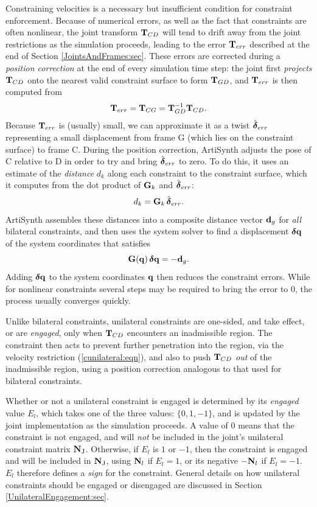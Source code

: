 Constraining velocities is a necessary but insufficient condition for
constraint enforcement. Because of numerical errors, as well as the
fact that constraints are often nonlinear, the joint transform
${\bf T}_{CD}$ will tend to drift away from the joint restrictions as the
simulation proceeds, leading to the error ${\bf T}_{err}$ described at the
end of Section \ref{JointsAndFrames:sec}. These errors are corrected
during a {\it position correction} at the end of every simulation time
step: the joint first {\it projects} ${\bf T}_{CD}$ onto the nearest valid
constraint surface to form ${\bf T}_{GD}$, and ${\bf T}_{err}$ is then computed from
%
\begin{equation}
{\bf T}_{err} = {\bf T}_{CG} = {\bf T}_{GD}^{-1} {\bf T}_{CD}.
\end{equation}
%
Because ${\bf T}_{err}$ is (usually) small, we can approximate it as
a twist $\hat{\boldsymbol\delta}_{err}$ representing a small displacement from frame
G (which lies on the constraint surface) to frame C. During the
position correction, ArtiSynth adjusts the pose of C relative to D in
order to try and bring $\hat{\boldsymbol\delta}_{err}$ to zero. To do this, it uses
an estimate of the {\it distance} $d_k$ along each constraint to the
constraint surface, which it computes from the dot product of ${\bf G}_k$
and $\hat{\boldsymbol\delta}_{err}$:
%
\begin{equation}
d_k = {\bf G}_k \, \hat{\boldsymbol\delta}_{err}.
\end{equation}
%
ArtiSynth assembles these distances into a composite distance vector
${\bf d}_g$ for {\it all} bilateral constraints, and then uses the system
solver to find a displacement $\boldsymbol\delta {\bf q}$ of the system coordinates
that satisfies
%
\begin{equation*}
{\bf G}({\bf q}) \, \boldsymbol\delta {\bf q} = -{\bf d}_g.
\end{equation*}
%
Adding $\boldsymbol\delta {\bf q}$ to the system coordinates ${\bf q}$ then reduces the
constraint errors. While for nonlinear constraints several steps may be
required to bring the error to 0, the process usually converges
quickly.

Unlike bilateral constraints, unilateral constraints are one-sided,
and take effect, or are {\it engaged}, only when ${\bf T}_{CD}$ encounters
an inadmissible region.  The constraint then acts to prevent further
penetration into the region, via the velocity restriction
(\ref{cunilateral:eqn}), and also to push ${\bf T}_{CD}$ {\it out} of the
inadmissible region, using a position correction analogous to that
used for bilateral constraints.

Whether or not a unilateral constraint is engaged is determined by its
{\it engaged} value $E_l$, which takes one of the three values:
$\{0, 1, -1\}$, and is updated by the joint implementation as the
simulation proceeds.  A value of 0 means that the constraint is not
engaged, and will {\it not} be included in the joint's unilateral
constraint matrix ${\bf N}_\text{J}$. Otherwise, if $E_l$ is $1$ or $-1$, then the
constraint is engaged and will be included in ${\bf N}_\text{J}$, using ${\bf N}_l$ if
$E_l = 1$, or its negative $-{\bf N}_l$ if $E_l = -1$. $E_l$ therefore
defines a {\it sign} for the constraint.  General details on how
unilateral constraints should be engaged or disengaged are discussed
in Section \ref{UnilateralEngagement:sec}.


